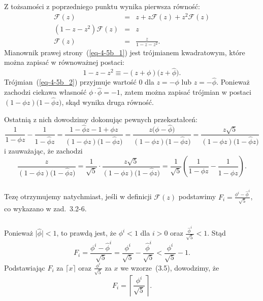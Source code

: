 \subsubsection{} %
Z tożsamości z poprzedniego punktu wynika pierwsza równość:
\begin{eqnarray}
	\mathcal{F}(z) &=& z+z\mathcal{F}(z)+z^2\mathcal{F}(z)\nonumber \\
	(1-z-z^2)\mathcal{F}(z) &=& z\nonumber \\
	\mathcal{F}(z) &=& \frac{z}{1-z-z^2}.\label{eq-4-5b_1}
\end{eqnarray}
Mianownik prawej strony~(\ref{eq-4-5b_1}) jest trójmianem kwadratowym, które można zapisać w równoważnej postaci:
\begin{equation}
	1-z-z^2 \equiv -(z+\phi)\bigl(z+\widehat\phi\bigr).\label{eq-4-5b_2}
\end{equation}
Trójmian~(\ref{eq-4-5b_2}) przyjmuje wartość 0 dla $z=-\phi$ lub $z=-\widehat\phi$. Ponieważ zachodzi ciekawa własność $\phi\cdot\widehat\phi=-1$, zatem można zapisać trójmian w postaci $(1-\phi z)\bigl(1-\widehat\phi z\bigr)$, skąd wynika druga równość.

Ostatnią z nich dowodzimy dokonując pewnych przekształceń:
\[
	\frac{1}{1-\phi z}-\frac{1}{1-\widehat\phi z} = \frac{1-\widehat\phi z-1+\phi z}{(1-\phi z)\bigl(1-\widehat\phi z\bigr)} = \frac{z\bigl(\phi-\widehat\phi\bigr)}{(1-\phi z)\bigl(1-\widehat\phi z\bigr)} = \frac{z\sqrt{5}}{(1-\phi z)\bigl(1-\widehat\phi z\bigr)}
\]
i zauważając, że zachodzi
\[
	\frac{z}{(1-\phi z)\bigl(1-\widehat\phi z\bigr)} = \frac{1}{\sqrt{5}}\cdot\frac{z\sqrt{5}}{(1-\phi z)\bigl(1-\widehat\phi z\bigr)} = \frac{1}{\sqrt{5}}\left(\frac{1}{1-\phi z}-\frac{1}{1-\widehat\phi z}\right).
\]

\subsubsection{} %
Tezę otrzymujemy natychmiast, jeśli w definicji $\mathcal{F}(z)$ podstawimy $F_i=\frac{\phi^i-\widehat\phi^i}{\sqrt{5}}$, co wykazano w zad.~3.2-6.

\subsubsection{} %
Ponieważ $\bigl|\widehat\phi\bigr|<1$, to prawdą jest, że $\phi^i<1$ dla $i>0$ oraz $\frac{\widehat\phi^i}{\sqrt{5}}<1$. Stąd
\[
	F_i = \frac{\phi^i-\widehat\phi^i}{\sqrt{5}} = \frac{\phi^i}{\sqrt{5}}-\frac{\widehat\phi^i}{\sqrt{5}} < \frac{\phi^i}{\sqrt{5}}-1.
\]
Podstawiając $F_i$ za $\lceil x\rceil$ oraz $\frac{\phi^i}{\sqrt{5}}$ za $x$ we wzorze~(3.5), dowodzimy, że
\[
	F_i = \left\lceil\frac{\phi^i}{\sqrt{5}}\right\rceil.
\]

